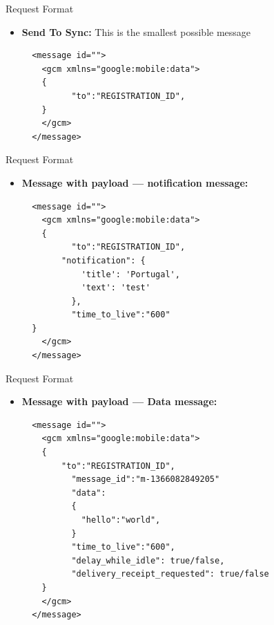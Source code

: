 \documentclass[10pt]{beamer}
\begin{document}
\begin{frame}[fragile]{Request Format}
\begin{itemize}
  \item \small\textbf{Send To Sync: } This is the smallest possible message
    \begin{lstlisting}
  <message id="">
    <gcm xmlns="google:mobile:data">
    {
          "to":"REGISTRATION_ID",  
    }
    </gcm>
  </message>
    \end{lstlisting}
  
\end{itemize}
\end{frame}
\begin{frame}[fragile]{Request Format}
\begin{itemize}
  
  \item \small\textbf{Message with payload — notification message: }
  \begin{lstlisting}
  <message id="">
    <gcm xmlns="google:mobile:data">
    {
          "to":"REGISTRATION_ID",   
        "notification": {
            'title': 'Portugal',
            'text': 'test'
          },
          "time_to_live":"600"
  }
    </gcm>
  </message>
    \end{lstlisting} 
 
\end{itemize}
\end{frame}
\begin{frame}[fragile]{Request Format}
\begin{itemize}
  
 
  \item \small\textbf{Message with payload — Data message: }
  \begin{lstlisting}
  <message id="">
    <gcm xmlns="google:mobile:data">
    {
        "to":"REGISTRATION_ID",
          "message_id":"m-1366082849205"
          "data":
          {
            "hello":"world",
          }
          "time_to_live":"600",
          "delay_while_idle": true/false,
          "delivery_receipt_requested": true/false
    }
    </gcm>
  </message>
    \end{lstlisting} 
\end{itemize}
\end{frame}
\end{document}
